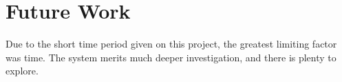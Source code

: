 \section{Future Work}
\label{section:future_work}

Due to the short time period given on this project, the greatest limiting factor was time. The system merits much deeper investigation, and there is plenty to explore.